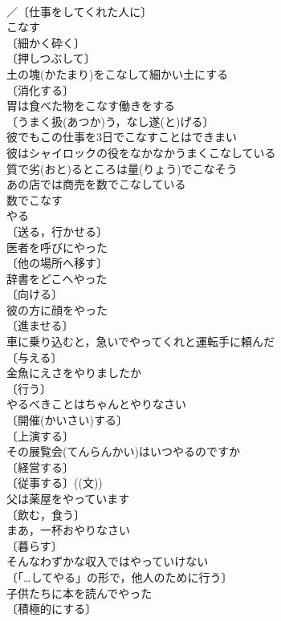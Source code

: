 \documentclass[8pt]{extreport}
\begin{document}
\begin{CJK}{UTF8}{min}
\\	／〔仕事をしてくれた人に〕
\\	こなす	
\\	〔細かく砕く〕
\\	〔押しつぶして〕
\\	土の塊(かたまり)をこなして細かい土にする 
\\	〔消化する〕
\\	胃は食べた物をこなす働きをする 
\\	〔うまく扱(あつか)う，なし遂(と)げる〕　
\\	彼でもこの仕事を3日でこなすことはできまい 
\\	彼はシャイロックの役をなかなかうまくこなしている 
\\	質で劣(おと)るところは量(りょう)でこなそう 
\\	あの店では商売を数でこなしている 
\\	数でこなす 
\\	やる	
\\	〔送る，行かせる〕
\\	医者を呼びにやった 
\\	〔他の場所へ移す〕　
\\	辞書をどこへやった 
\\	〔向ける〕
\\	彼の方に顔をやった 
\\	〔進ませる〕　
\\	車に乗り込むと，急いでやってくれと運転手に頼んだ 
\\	〔与える〕
\\	金魚にえさをやりましたか 
\\	〔行う〕
\\	やるべきことはちゃんとやりなさい 
\\	〔開催(かいさい)する〕
\\	〔上演する〕
\\	その展覧会(てんらんかい)はいつやるのですか 
\\	〔経営する〕
\\	〔従事する〕((文)) 
\\	父は薬屋をやっています 
\\	〔飲む，食う〕　
\\	まあ，一杯おやりなさい 
\\	〔暮らす〕　
\\	そんなわずかな収入ではやっていけない 
\\	〔「…してやる」の形で，他人のために行う〕
\\	子供たちに本を読んでやった 
\\	〔積極的にする〕

\end{CJK}
\end{document}

